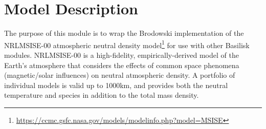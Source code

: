 
\section{Model Description}

The purpose of this module is to wrap the Brodowski implementation of the NRLMSISE-00 atmospheric neutral density model\footnote{\url{https://ccmc.gsfc.nasa.gov/models/modelinfo.php?model=MSISE}} for use with other Basilisk modules. NRLMSISE-00 is a high-fidelity, empirically-derived model of the Earth's atmosphere that considers the effects of common space phenomena (magnetic/solar influences) on neutral atmospheric density. A portfolio of individual models is valid up to 1000km, and provides both the neutral temperature and species in addition to the total mass density.
